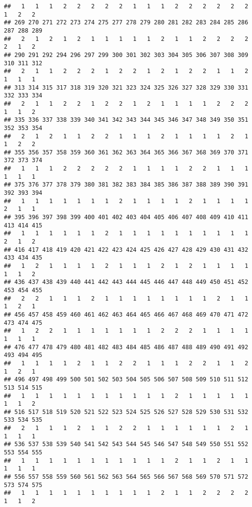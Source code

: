 \documentclass[
]{article}
\begin{document}
\begin{verbatim}
##   1   1   1   2   2   2   2   2   1   1   1   2   2   2   2   2   2   1   2   2 
## 269 270 271 272 273 274 275 277 278 279 280 281 282 283 284 285 286 287 288 289 
##   2   1   2   1   2   1   1   1   1   1   2   1   1   2   2   2   2   2   1   2 
## 290 291 292 294 296 297 299 300 301 302 303 304 305 306 307 308 309 310 311 312 
##   2   1   1   2   2   2   1   2   2   1   2   1   2   2   1   1   2   1   1   1 
## 313 314 315 317 318 319 320 321 323 324 325 326 327 328 329 330 331 332 333 334 
##   2   1   1   2   2   1   2   2   1   2   1   1   1   1   2   2   2   1   1   2 
## 335 336 337 338 339 340 341 342 343 344 345 346 347 348 349 350 351 352 353 354 
##   2   1   2   1   1   2   2   1   1   1   2   1   1   1   1   2   1   1   2   2 
## 355 356 357 358 359 360 361 362 363 364 365 366 367 368 369 370 371 372 373 374 
##   1   1   1   2   2   2   2   2   1   1   1   1   2   2   1   1   1   1   1   1 
## 375 376 377 378 379 380 381 382 383 384 385 386 387 388 389 390 391 392 393 394 
##   1   1   1   1   1   1   1   2   1   1   1   1   2   1   1   1   1   2   1   1 
## 395 396 397 398 399 400 401 402 403 404 405 406 407 408 409 410 411 413 414 415 
##   1   1   1   1   1   1   2   1   1   1   1   1   1   1   1   1   1   2   1   2 
## 416 417 418 419 420 421 422 423 424 425 426 427 428 429 430 431 432 433 434 435 
##   1   2   1   1   1   1   2   1   1   1   2   1   2   1   1   1   1   1   1   2 
## 436 437 438 439 440 441 442 443 444 445 446 447 448 449 450 451 452 453 454 455 
##   2   2   1   1   1   2   1   1   1   1   1   1   1   1   2   1   1   1   2   1 
## 456 457 458 459 460 461 462 463 464 465 466 467 468 469 470 471 472 473 474 475 
##   1   2   2   1   1   1   1   1   1   1   2   2   2   1   1   1   1   1   1   1 
## 476 477 478 479 480 481 482 483 484 485 486 487 488 489 490 491 492 493 494 495 
##   1   1   1   1   2   1   1   2   2   1   1   1   2   2   1   1   2   1   2   1 
## 496 497 498 499 500 501 502 503 504 505 506 507 508 509 510 511 512 513 514 515 
##   1   1   1   1   1   1   1   1   1   1   1   2   1   1   1   1   1   1   1   2 
## 516 517 518 519 520 521 522 523 524 525 526 527 528 529 530 531 532 533 534 535 
##   2   1   1   1   2   1   1   2   2   1   1   1   1   1   1   2   1   1   1   1 
## 536 537 538 539 540 541 542 543 544 545 546 547 548 549 550 551 552 553 554 555 
##   1   1   1   1   1   1   1   1   1   1   1   2   1   1   2   1   1   1   1   1 
## 556 557 558 559 560 561 562 563 564 565 566 567 568 569 570 571 572 573 574 575 
##   1   1   1   1   1   1   1   1   1   1   2   1   1   2   2   2   2   1   1   2 

\end{verbatim}
\end{document}
